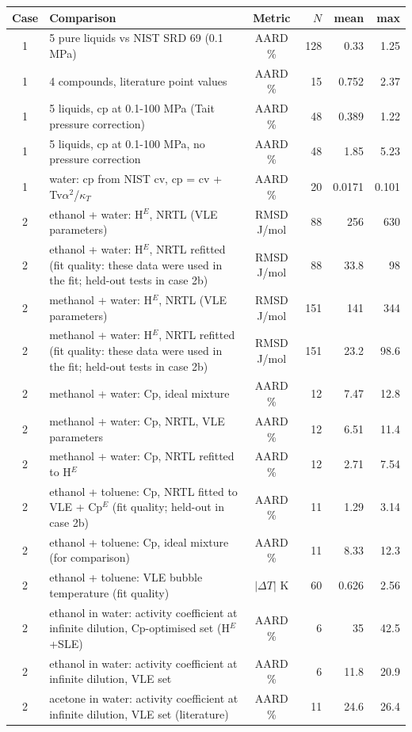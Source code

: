 \begin{tabular}{c p{8.6cm} c r r r}
\toprule
Case & Comparison & Metric & $N$ & mean & max \\
\midrule
1 & 5 pure liquids vs NIST SRD 69 (0.1 MPa) & AARD \% & 128 & 0.33 & 1.25 \\
1 & 4 compounds, literature point values & AARD \% & 15 & 0.752 & 2.37 \\
1 & 5 liquids, cp at 0.1-100 MPa (Tait pressure correction) & AARD \% & 48 & 0.389 & 1.22 \\
1 & 5 liquids, cp at 0.1-100 MPa, no pressure correction & AARD \% & 48 & 1.85 & 5.23 \\
1 & water: cp from NIST cv, cp = cv + Tv$\alpha^2$/$\kappa_T$ & AARD \% & 20 & 0.0171 & 0.101 \\
2 & ethanol + water: H$^E$, NRTL (VLE parameters) & RMSD J/mol & 88 & 256 & 630 \\
2 & ethanol + water: H$^E$, NRTL refitted (fit quality: these data were used in the fit; held-out tests in case 2b) & RMSD J/mol & 88 & 33.8 & 98 \\
2 & methanol + water: H$^E$, NRTL (VLE parameters) & RMSD J/mol & 151 & 141 & 344 \\
2 & methanol + water: H$^E$, NRTL refitted (fit quality: these data were used in the fit; held-out tests in case 2b) & RMSD J/mol & 151 & 23.2 & 98.6 \\
2 & methanol + water: Cp, ideal mixture & AARD \% & 12 & 7.47 & 12.8 \\
2 & methanol + water: Cp, NRTL, VLE parameters & AARD \% & 12 & 6.51 & 11.4 \\
2 & methanol + water: Cp, NRTL refitted to H$^E$ & AARD \% & 12 & 2.71 & 7.54 \\
2 & ethanol + toluene: Cp, NRTL fitted to VLE + Cp$^E$ (fit quality; held-out in case 2b) & AARD \% & 11 & 1.29 & 3.14 \\
2 & ethanol + toluene: Cp, ideal mixture (for comparison) & AARD \% & 11 & 8.33 & 12.3 \\
2 & ethanol + toluene: VLE bubble temperature (fit quality) & $|\Delta T|$ K & 60 & 0.626 & 2.56 \\
2 & ethanol in water: activity coefficient at infinite dilution, Cp-optimised set (H$^E$+SLE) & AARD \% & 6 & 35 & 42.5 \\
2 & ethanol in water: activity coefficient at infinite dilution, VLE set & AARD \% & 6 & 11.8 & 20.9 \\
2 & acetone in water: activity coefficient at infinite dilution, VLE set (literature) & AARD \% & 11 & 24.6 & 26.4 \\

\end{tabular}
